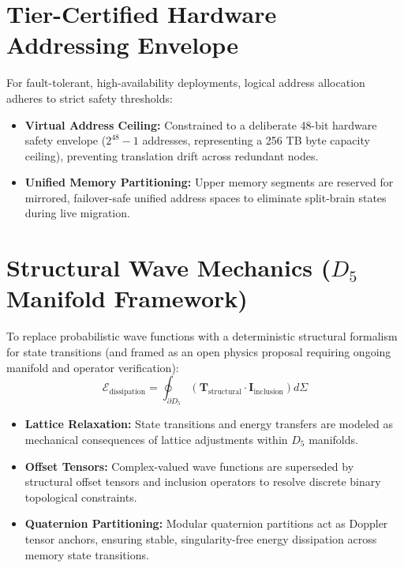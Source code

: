\documentclass[11pt,a4paper]{article}
\begin{document}
\section{Tier-Certified Hardware Addressing Envelope}
For fault-tolerant, high-availability deployments, logical address allocation adheres to strict safety thresholds:
\begin{itemize}
    \item \textbf{Virtual Address Ceiling:} Constrained to a deliberate 48-bit hardware safety envelope ($2^{48} - 1$ addresses, representing a 256 TB byte capacity ceiling), preventing translation drift across redundant nodes.
    \item \textbf{Unified Memory Partitioning:} Upper memory segments are reserved for mirrored, failover-safe unified address spaces to eliminate split-brain states during live migration.
\end{itemize}

\section{Structural Wave Mechanics ($D_5$ Manifold Framework)}
To replace probabilistic wave functions with a deterministic structural formalism for state transitions (and framed as an open physics proposal requiring ongoing manifold and operator verification):
\begin{equation}
    \mathcal{E}_{\text{dissipation}} = \oint_{\partial D_5} \left( \mathbf{T}_{\text{structural}} \cdot \mathbf{I}_{\text{inclusion}} \right) d\Sigma
\end{equation}
\begin{itemize}
    \item \textbf{Lattice Relaxation:} State transitions and energy transfers are modeled as mechanical consequences of lattice adjustments within $D_5$ manifolds.
    \item \textbf{Offset Tensors:} Complex-valued wave functions are superseded by structural offset tensors and inclusion operators to resolve discrete binary topological constraints.
    \item \textbf{Quaternion Partitioning:} Modular quaternion partitions act as Doppler tensor anchors, ensuring stable, singularity-free energy dissipation across memory state transitions.
\end{itemize}
\end{document}
